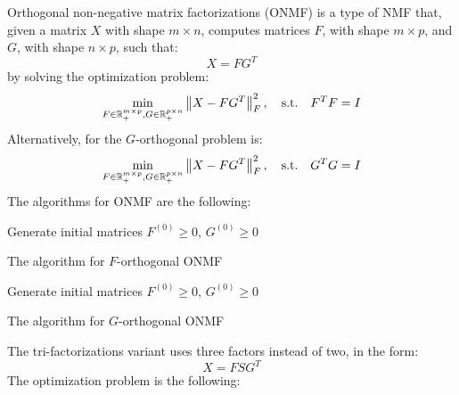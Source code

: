 Orthogonal non-negative matrix factorizations (ONMF) is a type of NMF that, given a matrix $X$ with shape $m \times n$, computes matrices $F$, with shape $m \times p$, and $G$, with shape $n \times p$, such that:
\begin{equation*}
X = FG^T
\end{equation*}
by solving the optimization problem:
\begin{equation*}
\min_{F \in \mathbb{R}^{m \times p}_+, G \in \mathbb{R}^{p \times n}_+} \left\lVert X - FG^T\right\rVert^2_F, \quad \text{s.t.} \quad F^TF = I
\end{equation*}
Alternatively, for the $G$-orthogonal problem is:
\begin{equation*}
\min_{F \in \mathbb{R}^{m \times p}_+, G \in \mathbb{R}^{p \times n}_+} \left\lVert X - FG^T\right\rVert^2_F, \quad \text{s.t.} \quad G^TG = I
\end{equation*}
The algorithms for ONMF are the following:
\vskip 0.7cm
\begin{algorithm}[H]
Generate initial matrices $F^{(0)} \geq 0$, $G^{(0)} \geq 0$\;
\caption{The algorithm for $F$-orthogonal ONMF}
\end{algorithm}
\vskip 0.7cm
\begin{algorithm}[H]
Generate initial matrices $F^{(0)} \geq 0$, $G^{(0)} \geq 0$\;
\caption{The algorithm for $G$-orthogonal ONMF}
\end{algorithm}
\vskip 0.7cm
The tri-factorizations \cite{10.1145/1150402.1150420} variant uses three factors instead of two, in the form:
\begin{equation*}
X = FSG^T
\end{equation*}
The optimization problem is the following:
